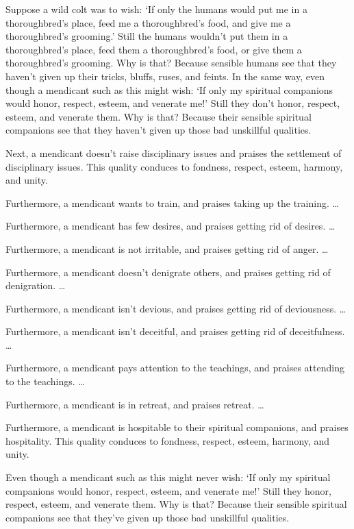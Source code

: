 \documentclass[12pt,openany]{book}%
\begin{document}
Suppose a wild colt was to wish: ‘If only the humans would put me in a thoroughbred’s place, feed me a thoroughbred’s food, and give me a thoroughbred’s grooming.’ Still the humans wouldn’t put them in a thoroughbred’s place, feed them a thoroughbred’s food, or give them a thoroughbred’s grooming. Why is that? Because sensible humans see that they haven’t given up their tricks, bluffs, ruses, and feints. In the same way, even though a mendicant such as this might wish: ‘If only my spiritual companions would honor, respect, esteem, and venerate me!’ Still they don’t honor, respect, esteem, and venerate them. Why is that? Because their sensible spiritual companions see that they haven’t given up those bad unskillful qualities. 

Next, a mendicant doesn’t raise disciplinary issues and praises the settlement of disciplinary issues. This quality conduces to fondness, respect, esteem, harmony, and unity. 

Furthermore, a mendicant wants to train, and praises taking up the training. … 

Furthermore, a mendicant has few desires, and praises getting rid of desires. … 

Furthermore, a mendicant is not irritable, and praises getting rid of anger. … 

Furthermore, a mendicant doesn’t denigrate others, and praises getting rid of denigration. … 

Furthermore, a mendicant isn’t devious, and praises getting rid of deviousness. … 

Furthermore, a mendicant isn’t deceitful, and praises getting rid of deceitfulness. … 

Furthermore, a mendicant pays attention to the teachings, and praises attending to the teachings. … 

Furthermore, a mendicant is in retreat, and praises retreat. … 

Furthermore, a mendicant is hospitable to their spiritual companions, and praises hospitality. This quality conduces to fondness, respect, esteem, harmony, and unity. 

Even though a mendicant such as this might never wish: ‘If only my spiritual companions would honor, respect, esteem, and venerate me!’ Still they honor, respect, esteem, and venerate them. Why is that? Because their sensible spiritual companions see that they’ve given up those bad unskillful qualities. 
\end{document}
